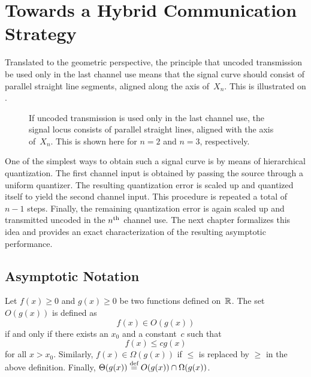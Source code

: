 \section{Towards a Hybrid Communication Strategy}

Translated to the geometric perspective, the principle that uncoded transmission
be used only in the last channel use means that the signal curve should consist
of parallel straight line segments, aligned along the axis of~$X_n$. This is
illustrated on .

\begin{figure}
  \centerline{%
  \subfloat[$n = 2$]{\label{fig:hybridlocus2}%
  }
  \hfil
  \subfloat[$n = 3$]{\label{fig:hybridlocus3}%
  }
  }
  \caption{If uncoded transmission is used only in the last channel use, the
  signal locus consists of parallel straight lines, aligned with the axis
  of~$X_n$. This is shown here for $n = 2$ and $n = 3$, respectively.}
  \label{fig:hybridlocus}
\end{figure}

One of the simplest ways to obtain such a signal curve is by means of
hierarchical quantization. The first channel input is obtained by passing the
source through a uniform quantizer. The resulting quantization error is scaled
up and quantized itself to yield the second channel input. This procedure is
repeated a total of $n-1$ steps. Finally, the remaining quantization error is
again scaled up and transmitted uncoded in the $n{^{\text{th}}}$ channel use. The next
chapter formalizes this idea and provides an exact characterization of the
resulting asymptotic performance. 


\begin{subappendices}
  \section{Asymptotic Notation}\label{app:asymptotic}

  \begin{definition}
    \label{def:bigo}
    Let $f(x) \ge 0$ and $g(x) \ge 0$ be two functions defined on~$\mathbb{R}$. The set
    $O(g(x))$ is defined as
    \begin{equation*}
      f(x) \in O(g(x))
    \end{equation*}
    if and only if there exists an $x_0$ and a constant~$c$ such that
    \begin{equation*}
      f(x) \le c g(x)
    \end{equation*}
    for all $x > x_0$. 
    Similarly, $f(x) \in \Omega(g(x))$ if $\le$ is replaced by $\ge$ in
    the above definition. Finally, $\Theta(g(x)) \stackrel{\text{def}}{=} O(g(x)) \cap
    \Omega(g(x))$.
  \end{definition}

  
\end{subappendices}
